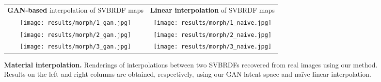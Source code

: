 \setlength{\resLen}{.96\columnwidth}
\begin{figure*}[t]
	\centering
	\addtolength{\tabcolsep}{-3pt}
	\begin{tabular}{cc}
		{\small \textbf{GAN-based} interpolation of SVBRDF maps} & {\small \textbf{Linear interpolation} of SVBRDF maps}\\
		\texttt{[image: results/morph/1\_gan.jpg]} &
		\texttt{[image: results/morph/1\_naive.jpg]}\\
		\texttt{[image: results/morph/2\_gan.jpg]} &
		\texttt{[image: results/morph/2\_naive.jpg]}\\
		\texttt{[image: results/morph/3\_gan.jpg]} &
		\texttt{[image: results/morph/3\_naive.jpg]}
	\end{tabular}
	\caption{\label{fig:interp}
		\textbf{Material interpolation.} Renderings of interpolations between two SVBRDFs recovered from real images using our method. Results on the left and right columns are obtained, respectively, using our GAN latent space and na\"ive linear interpolation.
	}
\end{figure*}
